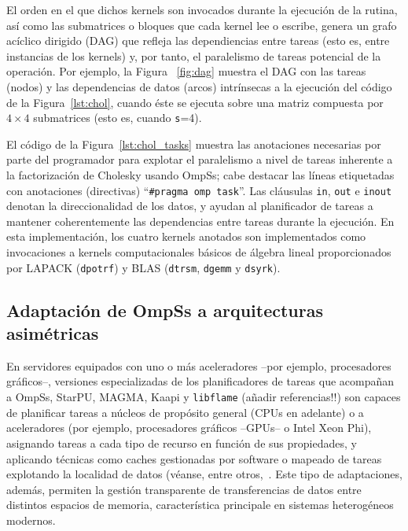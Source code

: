 El orden en el que dichos kernels son invocados durante la ejecución de la rutina, 
así como las submatrices o bloques que cada kernel lee o escribe, genera un grafo acíclico dirigido (DAG)
que refleja las dependiencias entre tareas (esto es, entre instancias de los kernels) y, por tanto,
el paralelismo de tareas potencial de la operación.
Por ejemplo, la Figura ~\ref{fig:dag} muestra el DAG con las tareas (nodos) y las dependencias de datos
(arcos) intrínsecas a la ejecución del código de la Figura~\ref{lst:chol}, cuando éste se ejecuta sobre
una matriz compuesta por $4 \times 4$ submatrices (esto es, cuando {\tt s}=4).  

El código de la Figura~\ref{lst:chol_tasks} muestra las anotaciones necesarias por parte del programador para explotar
el paralelismo a nivel de tareas inherente a la factorización de Cholesky usando OmpSs; cabe destacar las líneas etiquetadas
con  anotaciones (directivas) ``{\tt \#pragma omp task}''.
Las cláusulas {\tt in}, {\tt out} e {\tt inout} denotan la direccionalidad de los datos, y ayudan al planificador
de tareas a mantener coherentemente las dependencias entre tareas durante la ejecución. 
En esta implementación, los cuatro kernels anotados son implementados como invocaciones a 
kernels computacionales básicos de álgebra lineal proporcionados por LAPACK
({\tt dpotrf}) y BLAS ({\tt dtrsm}, {\tt dgemm} y {\tt dsyrk}).



\subsection{Adaptación de OmpSs a arquitecturas asimétricas}
\label{s3:botlev}

En servidores equipados con uno o más aceleradores --por ejemplo, procesadores gráficos--, versiones especializadas de los
planificadores de tareas que acompañan a OmpSs, StarPU, MAGMA, Kaapi y {\tt libflame} (añadir referencias!!) son capaces
de planificar tareas a núcleos de propósito general (CPUs en adelante) o a aceleradores (por ejemplo, procesadores gráficos
--GPUs-- o Intel Xeon Phi), asignando tareas a cada tipo de recurso en función de sus propiedades, y aplicando técnicas
como caches gestionadas por software o mapeado de tareas explotando la localidad de datos (véanse, entre 
otros,~\cite{Quintana:2008:PMA,CPE:CPE1463,Augonnet:2011:SUP:1951453.1951454,5470941,Gautier:2013:XRS:2510661.2511383}. Este
tipo de adaptaciones, además, permiten la gestión transparente de transferencias de datos entre distintos espacios de 
memoria, característica principale en sistemas heterogéneos modernos.

